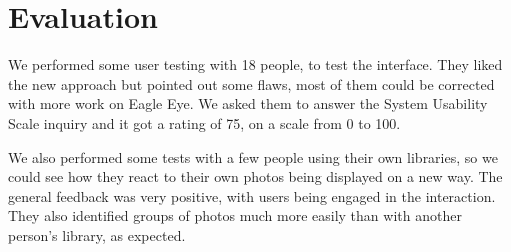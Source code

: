 \section{Evaluation} %
\label{chapter:evaluation}

We performed some user testing with 18 people, to test the interface. They liked the new approach but pointed out some flaws, most of them could be corrected with more work on Eagle Eye. We asked them to answer the System Usability Scale inquiry and it got a rating of 75, on a scale from 0 to 100.

We also performed some tests with a few people using their own libraries, so we could see how they react to their own photos being displayed on a new way. The general feedback was very positive, with users being engaged in the interaction. They also identified groups of photos much more easily than with another person's library, as expected.


